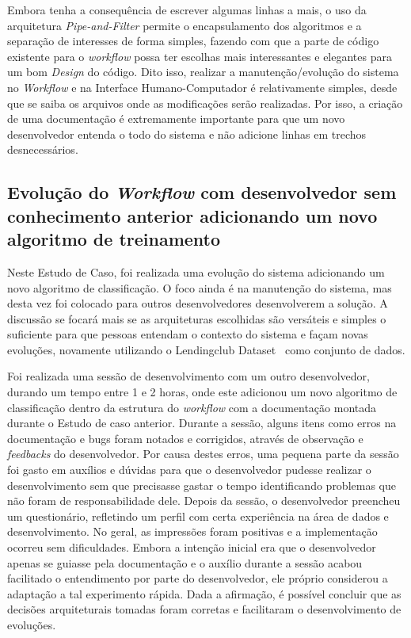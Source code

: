 \documentclass[twocolumn]{article}
\begin{document}
Embora tenha a consequência de escrever algumas linhas a mais, o uso da arquitetura \textit{Pipe-and-Filter} permite o encapsulamento dos algoritmos e a separação de interesses de forma simples, fazendo com que a parte de código existente para o \textit{workflow} possa ter escolhas mais interessantes e elegantes para um bom \textit{Design} do código. Dito isso, realizar a manutenção/evolução do sistema no \textit{Workflow} e na Interface Humano-Computador é relativamente simples, desde que se saiba os arquivos onde as modificações serão realizadas. Por isso, a criação de uma documentação é extremamente importante para que um novo desenvolvedor entenda o todo do sistema e não adicione linhas em trechos desnecessários.

\subsection{Evolução do \textit{Workflow} com desenvolvedor sem conhecimento anterior adicionando um novo algoritmo de treinamento}

Neste Estudo de Caso, foi realizada uma evolução do sistema adicionando um novo algoritmo de classificação. O foco ainda é na manutenção do sistema, mas desta vez foi colocado para outros desenvolvedores desenvolverem a solução. A discussão se focará mais se as arquiteturas escolhidas são versáteis e simples o suficiente para que pessoas entendam o contexto do sistema e façam novas evoluções, novamente utilizando o Lendingclub Dataset~\citep{lendingclub_2022} como conjunto de dados. 

Foi realizada uma sessão de desenvolvimento com um outro desenvolvedor, durando um tempo entre 1 e 2 horas, onde este adicionou um novo algoritmo de classificação dentro da estrutura do \textit{workflow} com a documentação montada durante o Estudo de caso anterior. Durante a sessão, alguns itens como erros na documentação e bugs foram notados e corrigidos, através de observação e \textit{feedbacks} do desenvolvedor. Por causa destes erros, uma pequena parte da sessão foi gasto em auxílios e dúvidas para que o desenvolvedor pudesse realizar o desenvolvimento sem que precisasse gastar o tempo identificando problemas que não foram de responsabilidade dele. Depois da sessão, o desenvolvedor preencheu um questionário, refletindo um perfil com certa experiência na área de dados e desenvolvimento. No geral, as impressões foram positivas e a implementação ocorreu sem dificuldades. Embora a intenção inicial era que o desenvolvedor apenas se guiasse pela documentação e o auxílio durante a sessão acabou facilitado o entendimento por parte do desenvolvedor, ele próprio considerou a adaptação a tal experimento rápida. Dada a afirmação, é possível concluir que as decisões arquiteturais tomadas foram corretas e facilitaram o desenvolvimento de evoluções.
\end{document}
